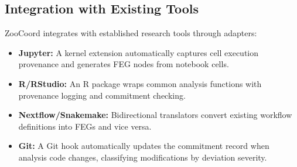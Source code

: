 \subsection{Integration with Existing Tools}

ZooCoord integrates with established research tools through adapters:

\begin{itemize}[leftmargin=*]
    \item \textbf{Jupyter:} A kernel extension automatically captures cell execution provenance and generates FEG nodes from notebook cells.
    \item \textbf{R/RStudio:} An R package wraps common analysis functions with provenance logging and commitment checking.
    \item \textbf{Nextflow/Snakemake:} Bidirectional translators convert existing workflow definitions into FEGs and vice versa.
    \item \textbf{Git:} A Git hook automatically updates the commitment record when analysis code changes, classifying modifications by deviation severity.
\end{itemize}

